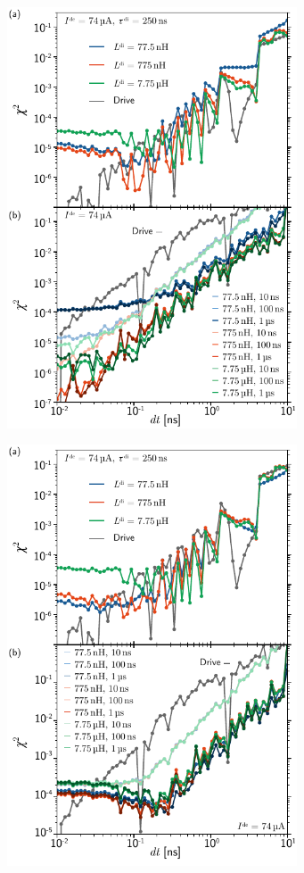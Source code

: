\documentclass[twocolumn]{article}
\begin{document}
\begin{figure}[h!]
\includegraphics[width=8.6cm]{figures/_fig__dendrites__error_vs_dt__2jj.pdf}
\end{figure}

\begin{figure}[h!]
\includegraphics[width=8.6cm]{figures/_fig__dendrites__error_vs_dt__4jj.pdf}
\end{figure}
\end{document}
